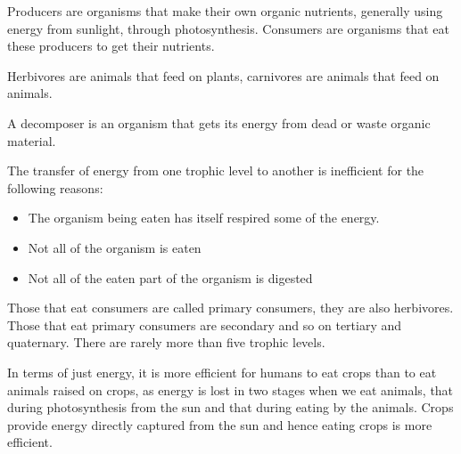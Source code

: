 Producers are organisms that make their own organic nutrients, generally using energy from 
sunlight, through photosynthesis. Consumers are organisms that eat these producers to get their
nutrients. 

Herbivores are animals that feed on plants, carnivores are animals that feed on animals.

A decomposer is an organism that gets its energy from dead or waste organic material.

The transfer of energy from one trophic level to another is inefficient for the following reasons:
\begin{itemize}
	\item The organism being eaten has itself respired some of the energy.
	\item Not all of the organism is eaten
	\item Not all of the eaten part of the organism is digested
\end{itemize}

Those that eat consumers are called primary consumers, they are also herbivores. Those that eat
primary consumers are secondary and so on tertiary and quaternary. There are rarely more than five
trophic levels.

In terms of just energy, it is more efficient for humans to eat crops than to eat animals raised on
crops, as energy is lost in two stages when we eat animals, that during photosynthesis from the sun
and that during eating by the animals. Crops provide energy directly captured from the sun and 
hence eating crops is more efficient.

